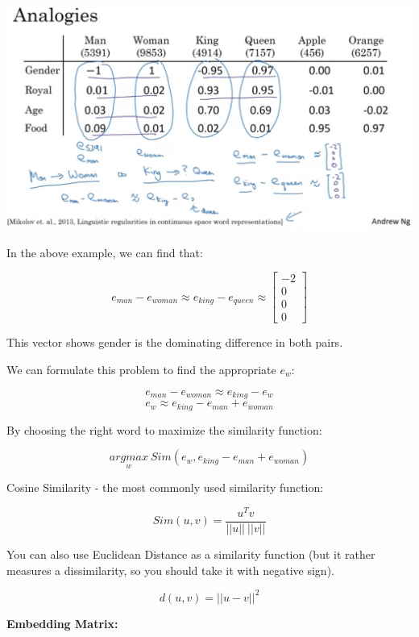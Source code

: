\documentclass{article}
\begin{document}
\begin{center}
\includegraphics[scale=0.3]{./images/analogy_reasoning.png}
\end{center}

\noindent In the above example, we can find that:

\[e_{man} - e_{woman} \approx e_{king} - e_{queen} \approx
\begin{bmatrix}
-2 \\
0 \\
0 \\
0
\end{bmatrix}
\]

\noindent This vector shows gender is the dominating difference in both pairs.

\bigskip

\noindent We can formulate this problem to find the appropriate \(e_{w}\):

\[e_{man} - e_{woman} \approx e_{king} - e_{w}\]
\[e_{w} \approx e_{king} - e_{man} + e_{woman}\]

\noindent By choosing the right word to maximize the similarity function:

\[\underset{w}{argmax} \ Sim(e_{w}, e_{king} - e_{man} + e_{woman})\]

\noindent Cosine Similarity - the most commonly used similarity function:

\[Sim(u, v) = \frac{u^{T}v}{\vert\vert u \vert\vert \ \vert\vert v \vert\vert}\]

\noindent You can also use Euclidean Distance as a similarity function (but it rather measures a dissimilarity, so you should take it with negative sign).

\[d(u, v) = \vert\vert u - v \vert\vert^{2}\]

\noindent \textbf{Embedding Matrix:}
\end{document}
